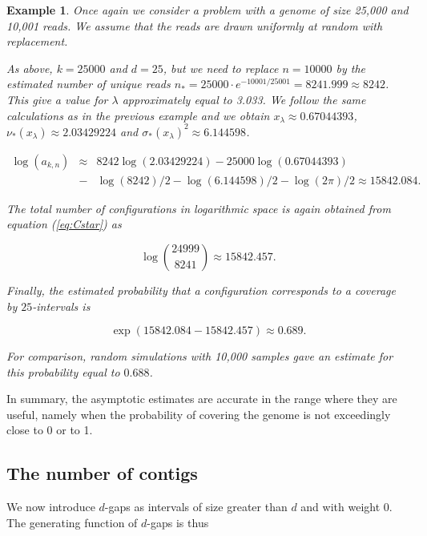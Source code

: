 \documentclass{article}
\newtheorem{example}{Example}
\begin{document}
\begin{example}

Once again we consider a problem with a genome of size 25,000 and 10,001
reads. We assume that the reads are drawn uniformly at random with
replacement.

As above, $k=25000$ and $d=25$, but we need to replace $n=10000$ by the
estimated number of unique reads $n_* = 25000 \cdot e^{-10001/25001} =
8241.999 \approx 8242$. This give a value for $\lambda$ approximately
equal to 3.033. We follow the same calculations as in the previous example
and we obtain $x_\lambda \approx 0.67044393$, $\nu_*(x_\lambda) \approx
2.03429224$ and $\sigma_*(x_\lambda)^2 \approx 6.144598$.

\begin{eqnarray*}
\log(a_{k,n}) &\approx& 8242\log(2.03429224) - 25000\log(0.67044393) \\
&-& \log(8242)/2 - \log(6.144598)/2 - \log(2\pi)/2
\approx 15842.084.
\end{eqnarray*}

The total number of configurations in logarithmic space is again
obtained from equation (\ref{eq:Cstar}) as

\begin{equation*}
\log { 24999 \choose 8241 } \approx 15842.457.
\end{equation*}

Finally, the estimated probability that a configuration corresponds to a
coverage by $25$-intervals is

\begin{equation*}
\exp(15842.084-15842.457) \approx 0.689.
\end{equation*}

For comparison, random simulations with 10,000 samples gave an estimate
for this probability equal to $0.688$.

\end{example}

In summary, the asymptotic estimates are accurate in the range where they
are useful, namely when the probability of covering the genome is not
exceedingly close to 0 or to 1.

\subsection{The number of contigs}

We now introduce $d$-gaps as intervals of size greater than $d$ and with
weight 0. The generating function of $d$-gaps is thus
\end{document}
